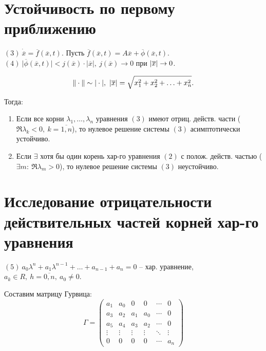 

\section{Устойчивость по первому приближению}

\begin{theorem}[Ляпунова]
	$(3) \ \dot{\overline{x} } = \overline{f} (\overline{x} ,t)$. Пусть $\overline{f} (\overline{x} ,t) = A \overline{x} + \overline{\phi } (\overline{x} ,t)$. \\
	$(4) \ \big|\overline{\phi } (\overline{x} ,t)\big|< j(\overline{x} ) \cdot |\overline{x} |, \ j(\overline{x} ) \rightarrow 0$ при $\left\lvert \overline{x} \right\rvert \rightarrow 0$.

	\[
		\|\cdot \| \sim |\cdot |, \ \abs{\overline{x} } = \sqrt{x_{1}^{2} + x_{2}^{2} + \ldots + x_{n}^{2} }.
	\]

	Тогда:
	\begin{enumerate}
		\item Если все корни $\lambda _1, \ldots ,\lambda _n$ уравнения $(3)$ имеют отриц. действ. части ($\Re \lambda _k < 0, \ k = \overline{1,n} $), то нулевое решение системы $(3)$ асимптотически устойчиво.
		\item Если $\exists$ хотя бы один корень хар-го уравнения $(2)$ с полож. действ. частью ($\exists m: \ \Re \lambda _m > 0$), то нулевое решение системы $(3)$ неустойчиво.
	\end{enumerate}
\end{theorem}

\section{Исследование отрицательности действительных частей корней хар-го уравнения}

$(5) \ a_0 \lambda ^n + a_1 \lambda^{n-1} + \ldots + a_{n-1} + a_n = 0$ -- хар. уравнение, $a_k \in R, \ h = \overline{0,n} , \ a_0 \ne 0$.

Составим матрицу Гурвица:
\[
	\Gamma = \left(\begin{array}{cccccc}
			a_1    & a_0    & 0      & 0      & \cdots & 0      \\
			a_3    & a_2    & a_1    & a_0    & \cdots & 0      \\
			a_5    & a_4    & a_3    & a_2    & \cdots & 0      \\
			\vdots & \vdots & \vdots & \vdots & \ddots & \vdots \\
			0      & 0      & 0      & 0      & \cdots & a_n
		\end{array}\right)
\]

